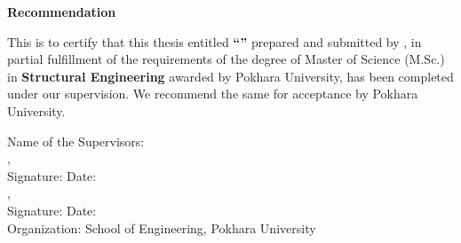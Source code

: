 \begin{titlepage}
\label{front:recommendation}
    
    \vspace*{28pt} 
    \vspace{10pt} %

    \begin{center}
        {\fontsize{16}{20}\selectfont \textbf{Recommendation}}
    \end{center}
    
    \vspace{14pt} 
    \vspace{10pt} %

    {\fontsize{12}{18}\selectfont
    \noindent
    This is to certify that this thesis entitled \textbf{``\myThesisTitle''} prepared and submitted by \textbf{\myStudentName}, in partial fulfillment of the requirements of the degree of Master of Science (M.Sc.) in \textbf{Structural Engineering} awarded by Pokhara University, has been completed under our supervision. We recommend the same for acceptance by Pokhara University.
    }

    \vspace*{42pt}
    \vspace{10pt} %

    \begin{flushleft}
        {\fontsize{12}{18}\selectfont
        Name of the Supervisors: \\[8pt]
        \mySupervisorOneName, \mySupervisorOneDesignation \\[8pt]
        Signature: \underline{\hspace{5cm}} \hspace{0.5cm} Date: \underline{\hspace{3cm}} \\[16pt]
        \mySupervisorTwoName, \mySupervisorTwoDesignation \\[8pt]
        Signature: \underline{\hspace{5cm}} \hspace{0.5cm} Date: \underline{\hspace{3cm}} \\[12pt]
        Organization: School of Engineering, Pokhara University
        }
    \end{flushleft}

\end{titlepage}